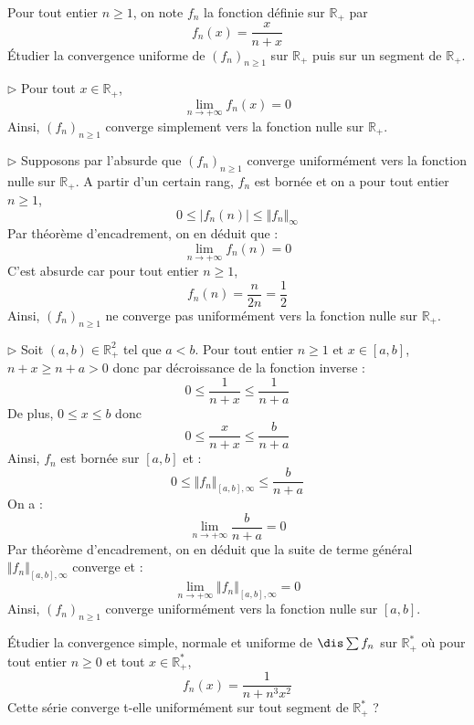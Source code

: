 \documentclass[a4paper,10pt]{report}
\begin{document}
\begin{Exercice}{} Pour tout entier $n \geq 1$, on note $f_n$ la fonction définie sur $\mathbb{R}_+$ par 
$$ f_n(x) = \frac{x}{n+x}$$
Étudier la convergence uniforme de $(f_n)_{n \geq 1}$ sur $\mathbb{R}_+$ puis sur un segment de $\mathbb{R}_+$.
\end{Exercice}

\corr 

\noindent $\rhd$ Pour tout $x \in \mathbb{R}_+$,
$$ \lim_{n \rightarrow + \infty} f_n(x) = 0$$
Ainsi, $(f_n)_{n \geq 1}$ converge simplement vers la fonction nulle sur $\mathbb{R}_+$.

\medskip

\noindent $\rhd$ Supposons par l'absurde que $(f_n)_{n \geq 1}$ converge uniformément vers la fonction nulle sur $\mathbb{R}_+$. A partir d'un certain rang, $f_n$ est bornée et on a pour tout entier $n \geq 1$,
$$ 0 \leq \vert f_n(n) \vert \leq \Vert f_n \Vert_{\infty}$$
Par théorème d'encadrement, on en déduit que :
$$ \lim_{n \rightarrow + \infty} f_n(n) = 0$$
C'est absurde car pour tout entier $n \geq 1$,
$$ f_n(n) = \dfrac{n}{2n} = \dfrac{1}{2}$$
Ainsi,  $(f_n)_{n \geq 1}$ ne converge pas uniformément vers la fonction nulle sur $\mathbb{R}_+$.

\medskip

\noindent $\rhd$ Soit $(a,b) \in \mathbb{R}_+^2$ tel que $a <b$. Pour tout entier $n \geq 1$ et $x \in [a,b]$, $n+x \geq n+a>0$ donc par décroissance de la fonction inverse :
$$ 0 \leq \dfrac{1}{n+x} \leq \dfrac{1}{n+a}$$
De plus, $0 \leq x \leq b$ donc 
$$ 0 \leq \dfrac{x}{n+x} \leq \dfrac{b}{n+a}$$
Ainsi, $f_n$ est bornée sur $[a,b]$ et :
$$ 0 \leq \Vert f_n \Vert_{[a,b],\infty} \leq \dfrac{b}{n+a}$$
On a :
$$ \lim_{n \rightarrow + \infty}  \dfrac{b}{n+a} = 0$$
Par théorème d'encadrement, on en déduit que la suite de terme général $\Vert f_n \Vert_{[a,b],\infty}$ converge et :
$$ \lim_{n \rightarrow + \infty} \Vert f_n \Vert_{[a,b],\infty} = 0$$
Ainsi, $(f_n)_{n \geq 1}$ converge uniformément vers la fonction nulle sur $[a,b]$.

\begin{Exercice}{} Étudier la convergence simple, normale et uniforme de $\dis \sum f_n$ sur $\mathbb{R}_+^*$ où pour tout entier $n \geq 0$ et tout $x \in \mathbb{R}_+^*$, 
$$ f_n(x) = \frac{1}{n+n^3x^2}$$
Cette série converge t-elle uniformément sur tout segment de $\mathbb{R}_+^*$ ?
\end{Exercice} 

\corr 
\end{document}
